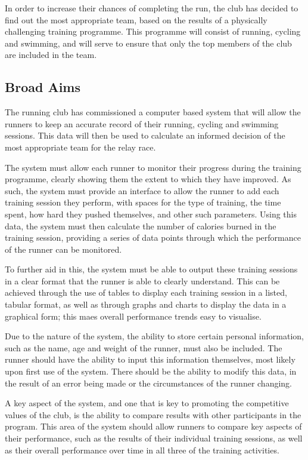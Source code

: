 \documentclass{article}[12pt,a4paper]
\begin{document}
In order to increase their chances of completing the run, the club has decided to find out the most appropriate team, based on the results of a physically challenging training programme. This programme will consist of running, cycling and swimming, and will serve to ensure that only the top members of the club are included in the team.

\subsection{Broad Aims}
The running club has commissioned  a computer based system that will allow the runners to keep an accurate record of their running, cycling and swimming sessions. This data will then be used to calculate an informed decision of the most appropriate team for the relay race.

The system must allow each runner to monitor their progress during the training programme, clearly showing them the extent to which they have improved. As such, the system must provide an interface to allow the runner to add each training session they perform, with spaces for the type of training, the time spent, how hard they pushed themselves, and other such parameters. Using this data, the system must then calculate the number of calories burned in the training session, providing a series of data points through which the performance of the runner can be monitored.

To further aid in this, the system must be able to output these training sessions in a clear format that the runner is able to clearly understand. This can be achieved through the use of tables to display each training session in a listed, tabular format, as well as through graphs and charts to display the data in a graphical form; this maes overall performance trends easy to visualise.

Due to the nature of the system, the ability to store certain personal information, such as the name, age and weight of the runner, must also be included. The runner should have the ability to input this information themselves, most likely upon first use of the system. There should be the ability to modify this data, in the result of an error being made or the circumstances of the runner changing.

A key aspect of the system, and one that is key to promoting the competitive values of the club, is the ability to compare results with other participants in the program. This area of the system should allow runners to compare key aspects of their performance, such as the results of their individual training sessions, as well as their overall performance over time in all three of the training activities.
\end{document}
